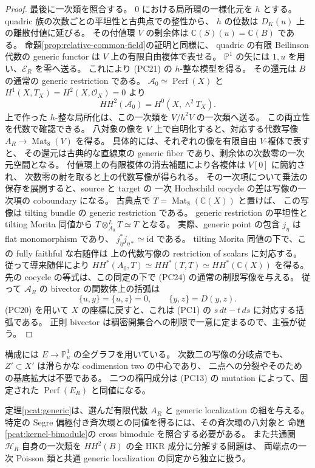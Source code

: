 \begin{proof}
最後に一次類を照合する。
$0$ における局所環の一様化元を $h$ とする。
quadric 族の次数ごとの平坦性と古典点での整性から、
$h$ の位数は $D_K(u)$ 上の離散付値に延びる。
その付値環 $V$ の剰余体は $\mathbb C(S)(u)=\mathbb C(B)$ である。
命題\ref{prop:relative-common-field}の証明と同様に、
quadric の有限 Beilinson 代数の generic functor は $V$ 上の有限自由複体で表せる。
$\mathbb P^1$ の矢には $1,u$ を用い、$\mathcal E_R$ を零へ送る。
これにより (PC21) の $h$-整な模型を得る。
その還元は $B$ の通常の generic restriction である。
$\mathcal A_0\simeq\operatorname{Perf}(X)$ と
$H^1(X,T_X)=H^2(X,\mathcal O_X)=0$ より
\[
 HH^2(\mathcal A_0)=H^0(X,\wedge^2T_X).
 \tag{PC24}
\]
上で作った $h$-整な局所化は、この一次類を $V/h^2V$ の一次類へ送る。
この両立性を代数で確認できる。
八対象の像を $V$ 上で自明化すると、対応する代数写像
$A_R\to\operatorname{Mat}_8(V)$ を得る。
具体的には、それぞれの像を有限自由 $V$-複体で表すと、
その還元は古典的な直線束の generic fiber であり、剰余体の次数零の一次元空間となる。
付値環上の有限複体の消去補題により各複体は $V[0]$ に簡約され、
次数零の射を取ると上の代数写像が得られる。
その一次項について乗法の保存を展開すると、source と target の
一次 Hochschild cocycle の差は写像の一次項の coboundary になる。
古典点で $T=\operatorname{Mat}_8(\mathbb C(X))$ と置けば、
この写像は tilting bundle の generic restriction である。
generic restriction の平坦性と tilting Morita 同値から
$T\otimes^L_{A_0}T\simeq T$ となる。
実際、generic point の包含 $j_\eta$ は flat monomorphism であり、
$j_\eta^*j_{\eta*}\simeq\mathrm{id}$ である。
tilting Morita 同値の下で、この fully faithful な右随伴は
上の代数写像の restriction of scalars に対応する。
従って導来随伴により
$HH^*(A_0,T)\simeq HH^*(T,T)\simeq HH^*(\mathbb C(X))$ を得る。
先の cocycle の等式は、この同定の下で (PC24) の通常の制限写像を与える。
従って $\mathcal A_R$ の bivector の関数体上の括弧は
\[
 \{u,y\}=\{u,z\}=0,\qquad \{y,z\}=D(y,z).
 \tag{PC25}
\]
(PC20) を用いて $X$ の座標に戻すと、これは (PC1) の
$s\,dt-t\,ds$ に対応する括弧である。
正則 bivector は稠密開集合への制限で一意に定まるので、主張が従う。
\end{proof}

\begin{remark}\label{pcat:scope}
構成には $E\to\mathbb P^1_u$ の全グラフを用いている。
次数二の写像の分岐点でも、$Z'\subset X'$ は滑らかな codimension two の中心であり、
二点への分裂やそのための基底拡大は不要である。
二つの楕円成分は (PC13) の mutation によって、固定された
$\operatorname{Perf}(E_R)$ と同値になる。

定理\ref{pcat:generic}は、選んだ有限代数 $A_R$ と generic localization の組を与える。
特定の Segre 偏極付き斉次環との同値を得るには、その斉次環の八対象と
命題\ref{pcat:kernel-bimodule}の cross bimodule を照合する必要がある。
また共通圏 $\mathcal H_R$ 自身の一次類を $HH^2(B)$ の全 HKR 成分に分解する問題は、
両端点の一次 Poisson 類と共通 generic localization の同定から独立に扱う。
\end{remark}
